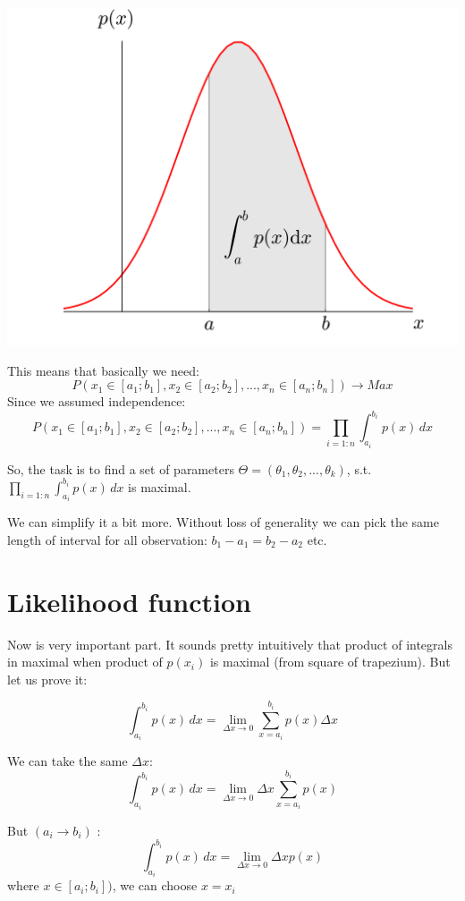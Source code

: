 \documentclass{article}
\begin{document}
\includegraphics[width=\textwidth]{PDF}

This means that basically we need:
$$ P(x_1 \in [a_1;b_1], x_2 \in [a_2;b_2], ... ,x_n \in [a_n; b_n]) \rightarrow Max $$
Since we assumed independence:
$$ P(x_1 \in [a_1;b_1], x_2 \in [a_2;b_2], ... ,x_n \in [a_n; b_n]) = \prod_{i=1:n}\int_{a_i}^{b_i} p(x) \,dx$$

So, the task is to find a set of parameters $\Theta = (\theta_1,\theta_2,...,\theta_k)$, s.t. $ \prod_{i=1:n}\int_{a_i}^{b_i} p(x) \,dx$ is maximal.

We can simplify it a bit more. Without loss of generality we can pick the same length of interval for all observation: 
$b_1 - a_1 = b_2 - a_2 $ etc.

\section{Likelihood function}
Now is very important part. It sounds pretty intuitively that product of integrals in maximal when product of $p(x_i)$ is maximal (from square of trapezium). But let us prove it:

$$ \int_{a_i}^{b_i} p(x) \,dx = \lim_{\Delta x \rightarrow 0}\sum_{x = a_i}^{b_i}p(x)\Delta x$$

We can take the same $\Delta x$:
$$ \int_{a_i}^{b_i} p(x) \,dx = \lim_{\Delta x \rightarrow 0}\Delta x \sum_{x = a_i}^{b_i}p(x)$$


But $(a_i \rightarrow b_i)$ :
$$ \int_{a_i}^{b_i} p(x) \,dx = \lim_{\Delta x \rightarrow 0}\Delta x p(x)$$ where $x \in [a_i;b_i])$, we can choose $x = x_i$
\end{document}
